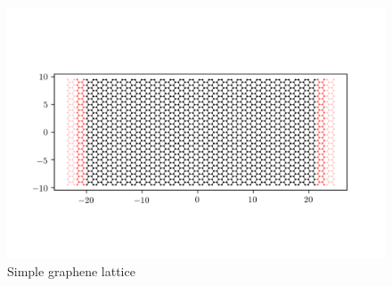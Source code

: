 \documentclass[12pt]{article}
\numberwithin{equation}{section}
\begin{document}
\newpage
\begin{figure}[h!]
  \begin{center}
  \includegraphics[height=0.85\textheight]{./media/graphene_lattice_W=20_L=40.png}
  \caption{Simple graphene lattice}
  \end{center}
\end{figure}
\end{document}
